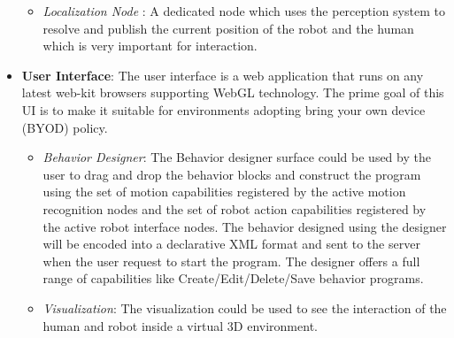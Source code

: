 \documentclass{llncs}
\begin{document}
\begin{itemize}
\begin{itemize}
\item \emph{Localization Node} : A dedicated node which uses the perception system to resolve and publish the current position of the robot and the human which is very important for interaction.
\end{itemize}
\item \textbf{User Interface}: The user interface is a web application that runs on any latest web-kit browsers supporting WebGL technology. The prime goal of this UI is to make it suitable for environments adopting bring your own device (BYOD) policy.
\begin{itemize}
\item \emph{Behavior Designer}: The Behavior designer surface could be used by the user to drag and drop the behavior blocks and construct the program using the set of motion capabilities registered by the active motion recognition nodes and the set of robot action capabilities registered by the active robot interface nodes. The behavior designed using the designer will be encoded into a declarative XML format and sent to the server when the user request to start the program. The designer offers a full range of capabilities like Create/Edit/Delete/Save behavior programs. 
\item \emph{Visualization}: The visualization could be used to see the interaction of the human and robot inside a virtual 3D environment.
\end{itemize}
\end{itemize}
\end{document}
